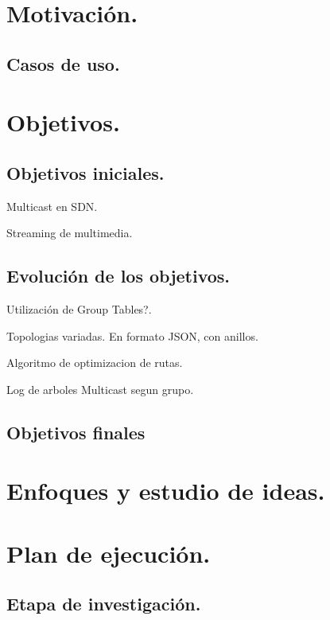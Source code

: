 \documentclass[12pt,a4paper,oneside]{book}
\begin{document}
\section{Motivación.}
\label{motivacion}

\subsection{Casos de uso.}

\section{Objetivos.}
\label{objetivos}

\subsection{Objetivos iniciales.}
\label{objetivosiniciales}

Multicast en SDN.

Streaming de multimedia.

\subsection{Evolución de los objetivos.}
\label{objetivosevolucion}

Utilización de Group Tables?.

Topologias variadas. En formato JSON, con anillos.

Algoritmo de optimizacion de rutas.

Log de arboles Multicast segun grupo.

\subsection{Objetivos finales}




\section{Enfoques y estudio de ideas.}
\label{enfoques}

\section{Plan de ejecución.}

\subsection{Etapa de investigación.}
\end{document}
